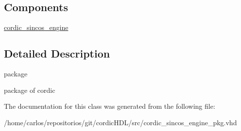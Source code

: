 \subsection*{Components}
 \begin{DoxyCompactItemize}
\item 
\mbox{\label{classcordic__sincos__engine__pkg_a5b6675e5d2175b286fabb394231a022a}} 
\hyperlink{classcordic__sincos__engine__pkg_a5b6675e5d2175b286fabb394231a022a}{cordic\+\_\+sincos\+\_\+engine}  {\bfseries }  
\end{DoxyCompactItemize}


\subsection{Detailed Description}
package 

package of cordic 

The documentation for this class was generated from the following file\+:\begin{DoxyCompactItemize}
\item 
/home/carlos/repositorios/git/cordic\+H\+D\+L/src/cordic\+\_\+sincos\+\_\+engine\+\_\+pkg.\+vhd\end{DoxyCompactItemize}

